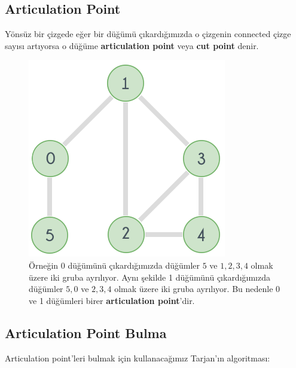 \documentclass[12pt]{article}
\begin{document}
    \cleardoublepage
    \subsection{Articulation Point}
    
    Yönsüz bir çizgede eğer bir düğümü çıkardığımızda o çizgenin connected çizge sayısı artıyorsa o düğüme \textbf{articulation point} veya \textbf{cut point} denir.
    
\begin{figure}[H]
\centering
\includegraphics[width=\linewidth/6*2]{cutpoint.png}
\caption{Örneğin 0 düğümünü çıkardığımızda düğümler {${5}$} ve {${1, 2, 3, 4}$} olmak üzere iki gruba ayrılıyor. Aynı şekilde 1 düğümünü çıkardığımızda düğümler {${5, 0}$} ve {${2, 3, 4}$} olmak üzere iki gruba ayrılıyor. Bu nedenle 0 ve 1 düğümleri birer \textbf{articulation point}'dir. }
\label{fig:prime1}
\end{figure}
    
    \subsection{Articulation Point Bulma}
    Articulation point'leri bulmak için kullanacağımız Tarjan'ın algoritması:
    
\end{document}
